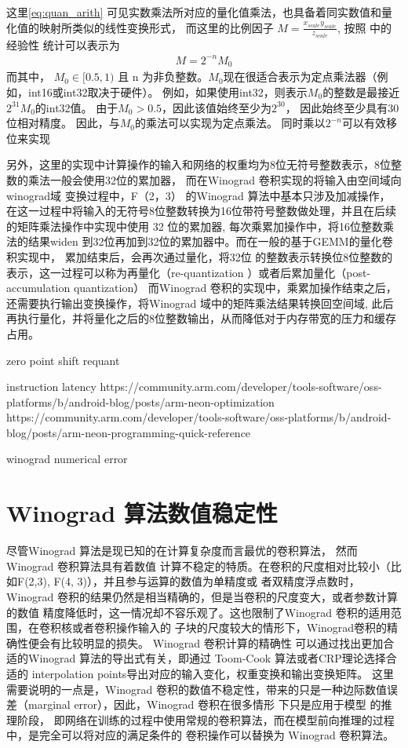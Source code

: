 这里\ref{eq:quan_arith} 可见实数乘法所对应的量化值乘法，也具备着同实数值和量化值的映射所类似的线性变换形式，
而这里的比例因子 $ M = \frac{x_{scale} y_{scale}}{z_{scale}}$, 按照 \cite{Jacob2017QuantizationAT} 中的经验性
统计可以表示为
\begin{align}
M = 2^{-n} M_0
\end{align}
而其中， $M_0 \in [0.5, 1)$ 且 n 为非负整数。$ M_0$现在很适合表示为定点乘法器（例如，int16或int32取决于硬件）。
例如，如果使用int32，则表示$M_0$的整数是最接近$2^{31}M_0$的int32值。 由于$M_0> 0.5$，因此该值始终至少为$2^{30}$，
因此始终至少具有30位相对精度。 因此，与$M_0$的乘法可以实现为定点乘法。 同时乘以$2^{-n}$可以有效移位来实现

另外，这里的实现中计算操作的输入和网络的权重均为8位无符号整数表示，8位整数的乘法一般会使用32位的累加器，
而在Winograd 卷积实现的将输入由空间域向winograd域 变换过程中，F（2，3） 的Winograd 算法中基本只涉及加减操作，
在这一过程中将输入的无符号8位整数转换为16位带符号整数做处理，并且在后续的矩阵乘法操作中实现中使用 32 位的累加器,
每次乘累加操作中，将16位整数乘法的结果widen 到32位再加到32位的累加器中。而在一般的基于GEMM的量化卷积实现中，
累加结束后，会再次通过量化，将32位 的整数表示转换位8位整数的表示，这一过程可以称为再量化（re-quantization ）或者后累加量化（post-accumulation quantization）
而Winograd 卷积的实现中，乘累加操作结束之后，还需要执行输出变换操作，将Winograd 域中的矩阵乘法结果转换回空间域,
此后再执行量化，并将量化之后的8位整数输出，从而降低对于内存带宽的压力和缓存占用。

zero point 
shift
requant

instruction latency
https://community.arm.com/developer/tools-software/oss-platforms/b/android-blog/posts/arm-neon-optimization
https://community.arm.com/developer/tools-software/oss-platforms/b/android-blog/posts/arm-neon-programming-quick-reference

winograd numerical error

\section{Winograd 算法数值稳定性}

尽管Winograd 算法是现已知的在计算复杂度而言最优的卷积算法， 然而 Winograd 卷积算法具有着数值
计算不稳定的特质。在卷积的尺度相对比较小（比如F(2,3), F(4, 3)），并且参与运算的数值为单精度或
者双精度浮点数时，Winograd 卷积的结果仍然是相当精确的，但是当卷积的尺度变大，或者参数计算的数值
精度降低时，这一情况却不容乐观了。这也限制了Winograd 卷积的适用范围，在卷积核或者卷积操作输入的
子块的尺度较大的情形下，Winograd卷积的精确性便会有比较明显的损失。 Winograd 卷积计算的精确性
可以通过找出更加合适的Winograd 算法的导出式有关，即通过 Toom-Cook 算法或者CRP理论选择合适的
interpolation points导出对应的输入变化，权重变换和输出变换矩阵。 这里需要说明的一点是，Winograd 
卷积的数值不稳定性，带来的只是一种边际数值误差（marginal error），因此，Winograd 卷积在很多情形
下只是应用于模型 的推理阶段，
即网络在训练的过程中使用常规的卷积算法，而在模型前向推理的过程中，是完全可以将对应的满足条件的
卷积操作可以替换为 Winograd 卷积算法。

